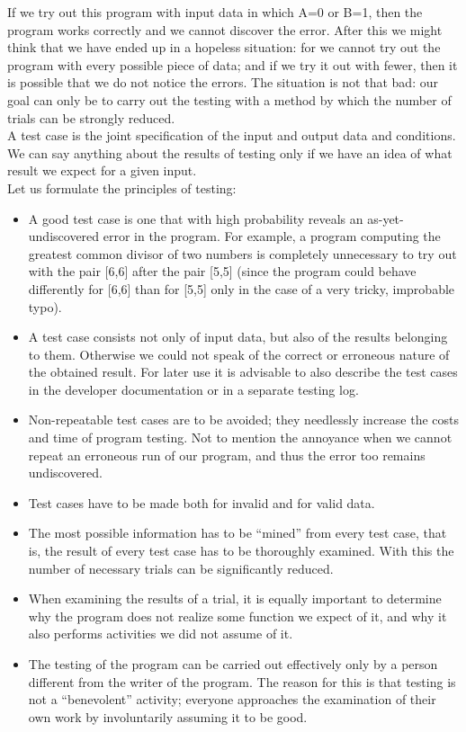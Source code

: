 \documentclass[margin=0px]{article}
\begin{document}
If we try out this program with input data in which A=0 or B=1, then the program works correctly and we cannot discover the error. After this we might think that we have ended up in a hopeless situation: for we cannot try out the program with every possible piece of data; and if we try it out with fewer, then it is possible that we do not notice the errors. The situation is not that bad: our goal can only be to carry out the testing with a method by which the number of trials can be strongly reduced.\\

A test case is the joint specification of the input and output data and conditions. We can say anything about the results of testing only if we have an idea of what result we expect for a given input.\\

\noindent Let us formulate the principles of testing:
\begin{itemize}
    \item 	A good test case is one that with high probability reveals an as-yet-undiscovered error in the program. For example, a program computing the greatest common divisor of two numbers is completely unnecessary to try out with the pair [6,6] after the pair [5,5] (since the program could behave differently for [6,6] than for [5,5] only in the case of a very tricky, improbable typo).

    \item 	A test case consists not only of input data, but also of the results belonging to them. Otherwise we could not speak of the correct or erroneous nature of the obtained result. For later use it is advisable to also describe the test cases in the developer documentation or in a separate testing log.

    \item	Non-repeatable test cases are to be avoided; they needlessly increase the costs and time of program testing. Not to mention the annoyance when we cannot repeat an erroneous run of our program, and thus the error too remains undiscovered.

    \item	Test cases have to be made both for invalid and for valid data.

    \item 	The most possible information has to be ``mined'' from every test case, that is, the result of every test case has to be thoroughly examined. With this the number of necessary trials can be significantly reduced.

    \item	When examining the results of a trial, it is equally important to determine why the program does not realize some function we expect of it, and why it also performs activities we did not assume of it.

    \item	The testing of the program can be carried out effectively only by a person different from the writer of the program. The reason for this is that testing is not a ``benevolent'' activity; everyone approaches the examination of their own work by involuntarily assuming it to be good.
\end{itemize}
\end{document}
